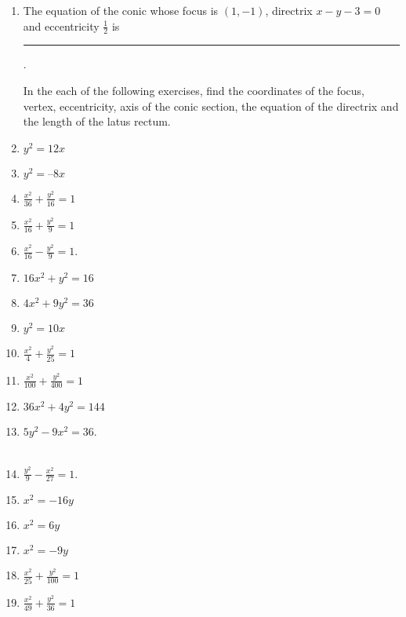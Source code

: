 \begin{enumerate}[label=\thesubsection.\arabic*,ref=\thesubsection.\theenumi]
\item The equation of the conic whose focus is $(1,-1)$, directrix $x-y-3
	=0$ and eccentricity $\frac{1}{2}$ is \rule{1cm}{0.1pt}.
	\\
	\solution 
		
In the each of the following exercises, find the coordinates of the focus, vertex, eccentricity, axis of the conic section, the equation of the directrix and the length of the latus rectum.
\item $y^2=12x$ 
\label{chapters/11/11/2/1}
\\
\solution

\item 
$y^2 = –8x$
  \item $\frac{x^2}{36}+\frac{y^2}{16}=1$
\\
\solution

  \item $\frac{x^2}{16}+\frac{y^2}{9}=1$
	\item $\frac{x^2}{16}-\frac{y^2}{9} = 1$. \\ 
		\solution
		
\begin{table}[H]
\centering
\caption{}
\label{tab:std-conic-params-sol}
\resizebox{\columnwidth}{!}{%
		
		}
\end{table}
  \item $16x^2+y^2=16$
  \item $4x^2+9y^2=36$
\item $y^2=10x$  
  \item $\frac{x^2}{4}+\frac{y^2}{25}=1$
\\
\solution

\begin{table}[H]
\centering
\caption{}
\label{tab:rot-conic-params-sol}
\resizebox{\columnwidth}{!}{%
		
		}
\end{table}
  \item $\frac{x^2}{100}+\frac{y^2}{400}=1$
  \item $36x^2+4y^2=144$
	\item $5{y^2}-9{x^2}=36$.
		\\
		\solution
		\\
		
	\item $\frac{y^2}{9}-\frac{x^2}{27}=1$.
\item $x^2=-16y$
\\
\solution

\item $x^2=6y$ 
\item $x^2=-9y$  
  \item $\frac{x^2}{25}+\frac{y^2}{100}=1$
  \item $\frac{x^2}{49}+\frac{y^2}{36}=1$
\end{enumerate}

